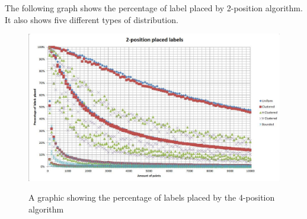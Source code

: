 \documentclass[crop=false,a4paper,oneside,11pt]{standalone}
\begin{document}
The following graph shows the percentage of label placed by 2-position algorithm. It also shows five different types of distribution.
\begin{figure}[h!]
 \centering
  \includegraphics[scale = 0.5]{2PosLabelsPlaced.JPG}\\
  \caption{A graphic showing the percentage of labels placed by the 4-position algorithm}
 \end{figure}
\end{document}
